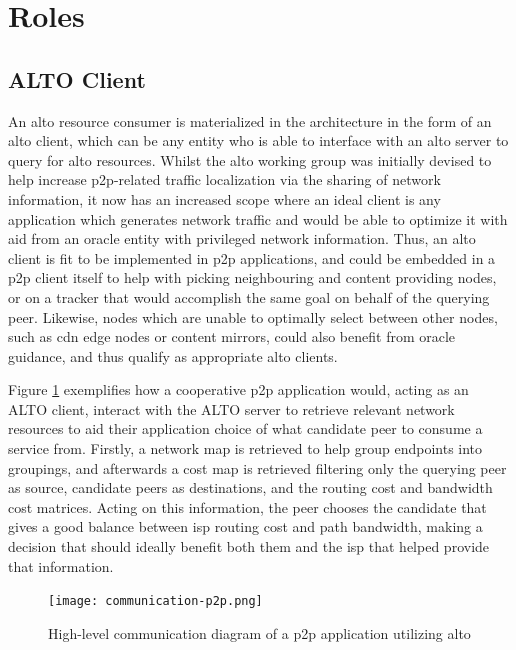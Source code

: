 \section{Roles}

\label{sec:arch-roles}

\subsection{ALTO Client}

    An \gls{alto} resource consumer is materialized in the architecture in the form of an \gls{alto} client, which can be any entity who is able to interface with an \gls{alto} server to query for \gls{alto} resources.
    Whilst the \gls{alto} working group was initially devised to help increase \gls{p2p}-related traffic localization via the sharing of network information, it now has an increased scope where an ideal client is any application which generates network traffic and would be able to optimize it with aid from an oracle entity with privileged network information.
    Thus, an \gls{alto} client is fit to be implemented in \gls{p2p} applications, and could be embedded in a \gls{p2p} client itself to help with picking neighbouring and content providing nodes, or on a tracker that would accomplish the same goal on behalf of the querying peer.
    Likewise, nodes which are unable to optimally select between other nodes, such as \gls{cdn} edge nodes or content mirrors, could also benefit from oracle guidance, and thus qualify as appropriate \gls{alto} clients.

    Figure \ref{fig:communication-p2p} exemplifies how a cooperative \gls{p2p} application would, acting as an ALTO client, interact with the ALTO server to retrieve relevant network resources to aid their application choice of what candidate peer to consume a service from.
    Firstly, a network map is retrieved to help group endpoints into groupings, and afterwards a cost map is retrieved filtering only the querying peer as source, candidate peers as destinations, and the routing cost and bandwidth cost matrices.
    Acting on this information, the peer chooses the candidate that gives a good balance between \gls{isp} routing cost and path bandwidth, making a decision that should ideally benefit both them and the \gls{isp} that helped provide that information.

\begin{figure}[H]
        \centering
        \hspace*{-0.7em}
        \texttt{[image: communication-p2p.png]}
        \caption{High-level communication diagram of a \gls{p2p} application utilizing \gls{alto}}
        \label{fig:communication-p2p}
\end{figure}

